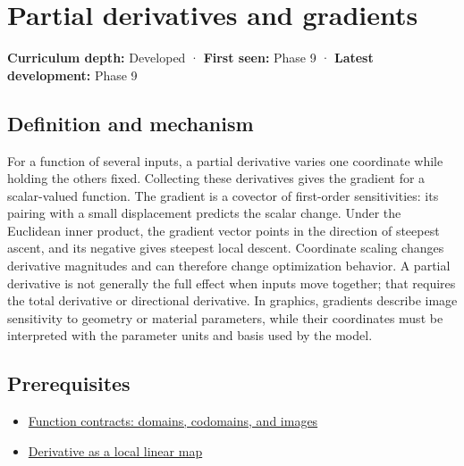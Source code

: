 \hypertarget{appendix-677b59746ae0}{}\label{referencestart:appendix-677b59746ae0}
\section{Partial derivatives and gradients}\label{appendix-677b59746ae0-partial-derivatives-and-gradients}

\textbf{Curriculum depth:} Developed · \textbf{First seen:} Phase 9 · \textbf{Latest development:} Phase 9

\begin{allmightroledefinition}

\subsection{Definition and mechanism}\label{appendix-677b59746ae0-definition-and-mechanism}

For a function of several inputs, a partial derivative varies one coordinate while holding the others fixed. Collecting these derivatives gives the gradient for a scalar-valued function. The gradient is a covector of first-order sensitivities: its pairing with a small displacement predicts the scalar change. Under the Euclidean inner product, the gradient vector points in the direction of steepest ascent, and its negative gives steepest local descent. Coordinate scaling changes derivative magnitudes and can therefore change optimization behavior. A partial derivative is not generally the full effect when inputs move together; that requires the total derivative or directional derivative. In graphics, gradients describe image sensitivity to geometry or material parameters, while their coordinates must be interpreted with the parameter units and basis used by the model.

\end{allmightroledefinition}

\subsection{Prerequisites}\label{appendix-677b59746ae0-prerequisites}

\begin{itemize}
\tightlist
\item
  \hyperref[appendix-a59658325cd6]{Function contracts: domains, codomains, and images}
\item
  \hyperref[appendix-7bc181935c42]{Derivative as a local linear map}
\end{itemize}

